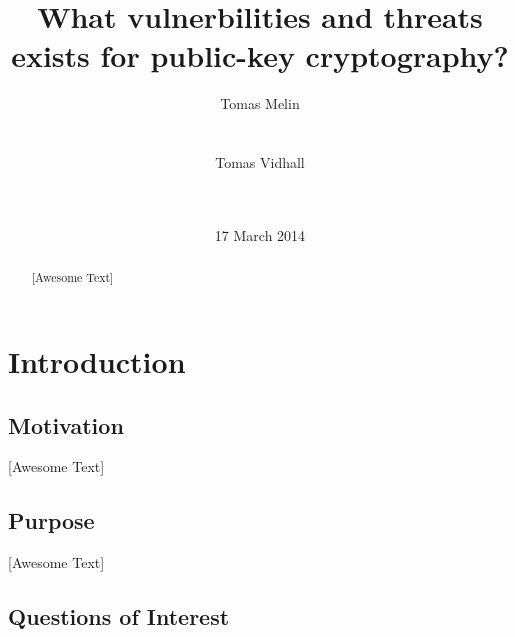 \documentclass{acm_proc_article-sp}
\begin{document}
\title{What vulnerbilities and threats exists for public-key cryptography?}
\author{
\alignauthor
Tomas Melin\\
        \\
        \\
\alignauthor
Tomas Vidhall\\
        \\
        \\
}
\date{17 March 2014}

\maketitle
\begin{abstract}
[Awesome Text]
\end{abstract}


\section{Introduction}

\subsection{Motivation}
[Awesome Text]

\subsection{Purpose}
[Awesome Text]

\subsection{Questions of Interest}
\end{document}
